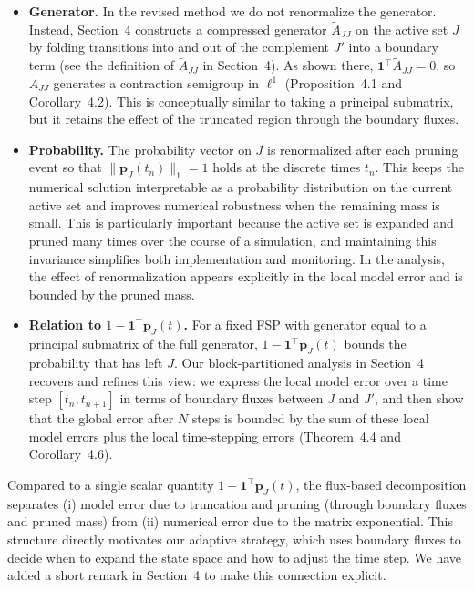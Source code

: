 \documentclass[11pt]{article}
\begin{document}
\begin{itemize}
  \item \textbf{Generator.} In the revised method we do not renormalize the
        generator. Instead, Section~4 constructs a compressed generator
        $\widetilde{A}_{JJ}$ on the active set $J$ by folding transitions into and
        out of the complement $J'$ into a boundary term (see the definition of
        $\widetilde{A}_{JJ}$ in Section~4). As shown there,
        $\mathbf{1}^\top \widetilde{A}_{JJ} = 0$, so $\widetilde{A}_{JJ}$
        generates a contraction semigroup in $\ell^1$ (Proposition~4.1 and
        Corollary~4.2). This is conceptually similar to taking a principal
        submatrix, but it retains the effect of the truncated region through the
        boundary fluxes.

  \item \textbf{Probability.} The probability vector on $J$ is renormalized after
        each pruning event so that $\|\mathbf{p}_J(t_n)\|_1 = 1$ holds at the
        discrete times $t_n$. This keeps the numerical solution interpretable as a
        probability distribution on the current active set and improves numerical
        robustness when the remaining mass is small. This is particularly
        important because the active set is expanded and pruned many times over
        the course of a simulation, and maintaining this invariance simplifies
        both implementation and monitoring. In the analysis, the effect of
        renormalization appears explicitly in the local model error and is
        bounded by the pruned mass.

  \item \textbf{Relation to $1-\mathbf{1}^\top\mathbf{p}_J(t)$.} For a fixed FSP with
        generator equal to a principal submatrix of the full generator,
        $1-\mathbf{1}^\top\mathbf{p}_J(t)$ bounds the probability that has left
        $J$. Our block-partitioned analysis in Section~4 recovers and refines this
        view: we express the local model error over a time step $[t_n,t_{n+1}]$ in
        terms of boundary fluxes between $J$ and $J'$, and then show that the
        global error after $N$ steps is bounded by the sum of these local model
        errors plus the local time-stepping errors (Theorem~4.4 and
        Corollary~4.6).
\end{itemize}

Compared to a single scalar quantity $1-\mathbf{1}^\top\mathbf{p}_J(t)$, the
flux-based decomposition separates (i) model error due to truncation and pruning
(through boundary fluxes and pruned mass) from (ii) numerical error due to the
matrix exponential. This structure directly motivates our adaptive strategy,
which uses boundary fluxes to decide when to expand the state space and how to
adjust the time step. We have added a short remark in Section~4 to make this
connection explicit.
\end{document}
